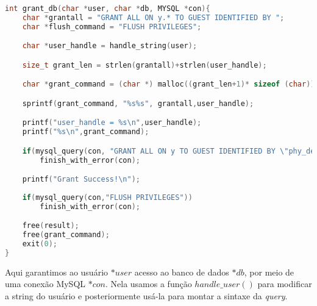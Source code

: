 \begin{lstlisting}[language=c, caption={fun\c{c}\~{a}o $grant\_db()$}, label={lst:dbphi8}]
int grant_db(char *user, char *db, MYSQL *con){
    char *grantall = "GRANT ALL ON y.* TO GUEST IDENTIFIED BY ";
	char *flush_command = "FLUSH PRIVILEGES";

	char *user_handle = handle_string(user);

	size_t grant_len = strlen(grantall)+strlen(user_handle);

	char *grant_command = (char *) malloc((grant_len+1)* sizeof (char));

	sprintf(grant_command, "%s%s", grantall,user_handle);

	printf("user_handle = %s\n",user_handle);
	printf("%s\n",grant_command);

	if(mysql_query(con, "GRANT ALL ON y TO GUEST IDENTIFIED BY \"phy_dev\""))
		finish_with_error(con);

	printf("Grant Success!\n");
	
	if(mysql_query(con,"FLUSH PRIVILEGES"))
		finish_with_error(con);

	free(result);
	free(grant_command);	
	exit(0);
}
\end{lstlisting}

Aqui garantimos ao usu\'{a}rio \textit{$*user$} acesso ao banco de dados
\textit{$*db$}, por meio de uma conex\~{a}o MySQL \textit{$*con$}. Nela usamos a
fun\c{c}\~{a}o \textit{$handle\_user()$} para modificar a string do usu\'{a}rio
e posteriormente us\'{a}-la para montar a sintaxe da \textit{query}.

